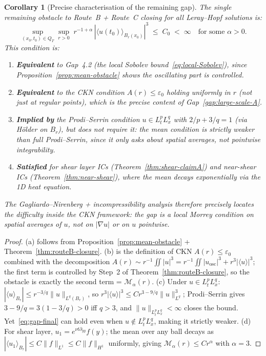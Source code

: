 \documentclass[11pt]{article}
\newtheorem{corollary}[theorem]{Corollary}
\theoremstyle{definition}
\theoremstyle{remark}
\begin{document}
\begin{corollary}[Precise characterisation of the remaining gap]
\label{cor:gap-characterisation}
  The single remaining obstacle to Route~B + Route~C closing for all Leray--Hopf solutions
  is:
  \begin{equation}\label{eq:gap-final}
    \boxed{
    \sup_{(x_0,t_0)\in Q_T}\sup_{r>0}\;r^{-1+\alpha}\,|\langle u(t_0)\rangle_{B_r(x_0)}|^3
    \;\leq\; C_0 \;<\; \infty \quad \text{for some }\alpha>0.
    }
  \end{equation}
  This condition is:
  \begin{enumerate}
    \item[(a)] \textbf{Equivalent} to Gap~4.2 (the local Sobolev bound~\eqref{eq:local-Sobolev}),
      since Proposition~\ref{prop:mean-obstacle} shows the oscillating part is controlled.
    \item[(b)] \textbf{Equivalent} to the CKN condition $A(r)\leq\varepsilon_0$ holding
      uniformly in $r$ (not just at regular points), which is the precise content of
      Gap~\ref{gap:large-scale-A}.
    \item[(c)] \textbf{Implied by} the Prodi--Serrin condition $u\in L^p_tL^q_x$ with
      $2/p + 3/q = 1$ (via Hölder on $B_r$), but does not require it: the mean condition
      is \emph{strictly weaker} than full Prodi--Serrin, since it only asks about spatial
      averages, not pointwise integrability.
    \item[(d)] \textbf{Satisfied} for shear layer ICs (Theorem~\ref{thm:shear-claimA})
      and near-shear ICs (Theorem~\ref{thm:near-shear}), where the mean decays
      exponentially via the 1D heat equation.
  \end{enumerate}
  The Gagliardo--Nirenberg + incompressibility analysis therefore
  \emph{precisely locates the difficulty} inside the CKN framework:
  the gap is a local Morrey condition on spatial averages of $u$,
  not on $|\nabla u|$ or on $u$ pointwise.
\end{corollary}

\begin{proof}
  (a) follows from Proposition~\ref{prop:mean-obstacle} + Theorem~\ref{thm:routeB-closure}.
  (b) is the definition of CKN $A(r)\leq\varepsilon_0$ combined with the decomposition
  $A(r)\sim r^{-1}\iint|u|^3 = r^{-1}\iint|u_{\mathrm{osc}}|^3 + r^3|\langle u\rangle|^3$;
  the first term is controlled by Step~2 of Theorem~\ref{thm:routeB-closure},
  so the obstacle is exactly the second term = $\mathcal{M}_\alpha(r)$.
  (c) Under $u\in L^p_tL^q_x$: $|\langle u\rangle_{B_r}|\leq r^{-3/q}\|u\|_{L^q(B_r)}$,
  so $r^3|\langle u\rangle|^3\leq C r^{3-9/q}\|u\|_{L^q}^3$; Prodi--Serrin gives
  $3-9/q=3(1-3/q)>0$ iff $q>3$, and $\|u\|_{L^p_t L^q_x}<\infty$ closes the bound.
  Yet~\eqref{eq:gap-final} can hold even when $u\notin L^p_tL^q_x$, making it strictly weaker.
  (d) For shear layer, $u_1 = e^{\nu t\partial_{yy}}f(y)$; the mean over any ball decays as
  $|\langle u_1\rangle_{B_r}|\leq C\|f\|_{L^1}\leq C\|f\|_{H^1}$ uniformly, giving $\mathcal{M}_\alpha(r)\leq Cr^\alpha$ with $\alpha=3$.
\end{proof}
\end{document}
